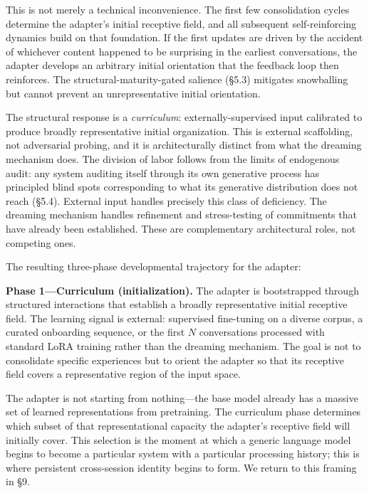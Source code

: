 \documentclass[11pt]{article}
\begin{document}
This is not merely a technical inconvenience. The first few consolidation cycles determine the adapter's initial receptive field, and all subsequent self-reinforcing dynamics build on that foundation. If the first updates are driven by the accident of whichever content happened to be surprising in the earliest conversations, the adapter develops an arbitrary initial orientation that the feedback loop then reinforces. The structural-maturity-gated salience (\S 5.3) mitigates snowballing but cannot prevent an unrepresentative initial orientation.

The structural response is a \emph{curriculum}: externally-supervised input calibrated to produce broadly representative initial organization. This is external scaffolding, not adversarial probing, and it is architecturally distinct from what the dreaming mechanism does. The division of labor follows from the limits of endogenous audit: any system auditing itself through its own generative process has principled blind spots corresponding to what its generative distribution does not reach (\S 5.4). External input handles precisely this class of deficiency. The dreaming mechanism handles refinement and stress-testing of commitments that have already been established. These are complementary architectural roles, not competing ones.

The resulting three-phase developmental trajectory for the adapter:

\textbf{Phase 1---Curriculum (initialization).} The adapter is bootstrapped through structured interactions that establish a broadly representative initial receptive field. The learning signal is external: supervised fine-tuning on a diverse corpus, a curated onboarding sequence, or the first $N$ conversations processed with standard LoRA training rather than the dreaming mechanism. The goal is not to consolidate specific experiences but to orient the adapter so that its receptive field covers a representative region of the input space.

The adapter is not starting from nothing---the base model already has a massive set of learned representations from pretraining. The curriculum phase determines which subset of that representational capacity the adapter's receptive field will initially cover. This selection is the moment at which a generic language model begins to become a particular system with a particular processing history; this is where persistent cross-session identity begins to form. We return to this framing in \S 9.
\end{document}

